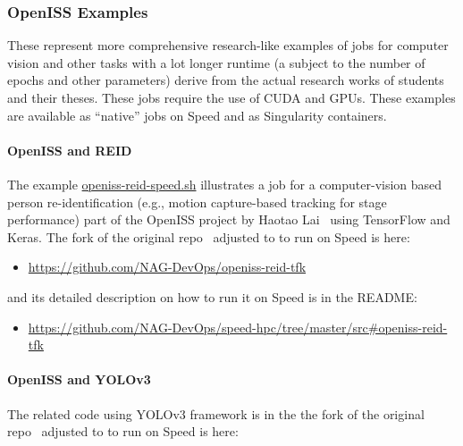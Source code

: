 \subsubsection{OpenISS Examples}
\label{sect:openiss-examples}

These represent more comprehensive research-like examples of
jobs for computer vision and other tasks with a lot longer
runtime (a subject to the number of epochs and other parameters)
derive from the actual research works of students and their
theses.
%
These jobs require the use of CUDA and GPUs.
These examples are available as ``native'' jobs on Speed
and as Singularity containers.

\paragraph{OpenISS and REID}
\label{sect:openiss-reid}

The example
  \href{https://github.com/NAG-DevOps/speed-hpc/blob/master/src/openiss-reid-speed.sh}
  {openiss-reid-speed.sh}
illustrates a job for a computer-vision based person re-identification
(e.g., motion capture-based tracking for stage performance) part of the OpenISS
project by Haotao Lai~\cite{lai-haotao-mcthesis19} using TensorFlow and Keras.
The fork of the original repo~\cite{openiss-reid-tfk} adjusted to to run on Speed is here:

\begin{itemize}
	\item \url{https://github.com/NAG-DevOps/openiss-reid-tfk}
\end{itemize}

and its detailed description on how to run it on Speed is
in the README:

\begin{itemize}
	\item \url{https://github.com/NAG-DevOps/speed-hpc/tree/master/src#openiss-reid-tfk}
\end{itemize}

\paragraph{OpenISS and YOLOv3}
\label{sect:openiss-yolov3}

The related code using YOLOv3 framework is in the
the fork of the original repo~\cite{openiss-yolov3} adjusted
to to run on Speed is here:

